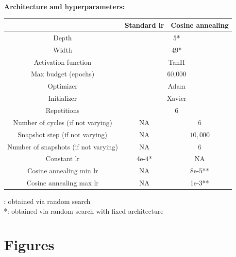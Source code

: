 \noindent
\textbf{Architecture and hyperparameters:}
\begin{center}
	\begin{tabular}{ | c || c| c|} 
		\hline
		 & Standard lr & Cosine annealing	\\
		\hline
		Depth & \multicolumn{2}{c|}{5*} \\
		\hline
		Width  & \multicolumn{2}{c|}{49*} \\
		\hline
		Activation function  & \multicolumn{2}{c|}{TanH} \\
		\hline
		Max budget (epochs)& \multicolumn{2}{c|}{60,000} \\
		\hline
		Optimizer& \multicolumn{2}{c|}{Adam} \\
		\hline
		Initializer& \multicolumn{2}{c|}{Xavier} \\
		\hline
		Repetitions& \multicolumn{2}{c|}{6} \\
		\hline
		Number of cycles (if not varying) &  NA & 6\\ 
		\hline
		Snapshot step (if not varying) & NA  & $10,000$\\ 
		\hline
		Number of snapshots (if not varying) &  NA  & 6\\ 
		\hline
		Constant lr & 4e-4* & NA\\ 
		\hline
		Cosine annealing min lr & NA & 8e-5**\\ 
		\hline
		Cosine annealing max lr & NA & 1e-3**\\ 
		\hline
	\end{tabular}
\end{center}
\noindent *: obtained via random search \\
\noindent **: obtained via random search with fixed architecture

\section{Figures}

